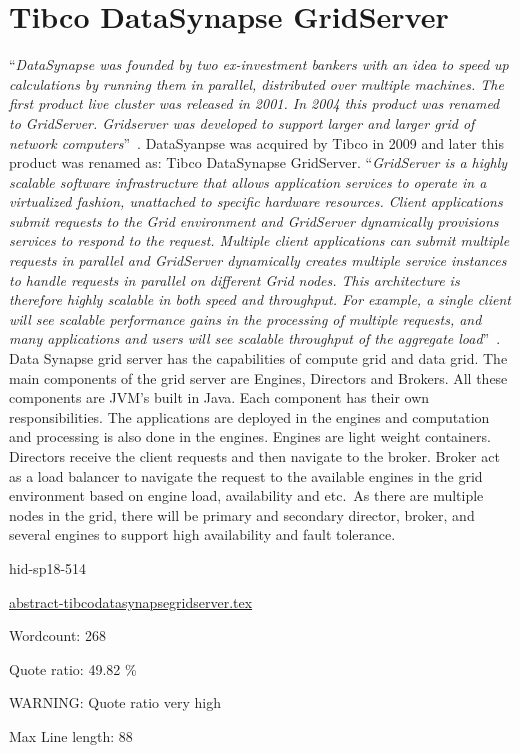 \section{Tibco DataSynapse GridServer}

\color{blue}``\emph{DataSynapse was founded by two ex-investment bankers with an idea to
speed up calculations by running them in parallel, distributed over
multiple machines. The first product live cluster was released in
2001. In 2004 this product was renamed to GridServer. Gridserver was
developed to support larger and larger grid of network
computers}''\color{black}~\cite{hid-sp18-514-datasynapsewiki}. DataSyanpse was
acquired by Tibco in 2009 and later this product was renamed as: Tibco
DataSynapse GridServer\cite{hid-sp18-514-tibcodatasynapsewiki}.
\color{blue}``\emph{GridServer is a highly scalable software infrastructure that allows
application services to operate in a virtualized fashion, unattached
to specific hardware resources. Client applications submit requests to
the Grid environment and GridServer dynamically provisions services to
respond to the request. Multiple client applications can submit
multiple requests in parallel and GridServer dynamically creates
multiple service instances to handle requests in parallel on different
Grid nodes. This architecture is therefore highly scalable in both
speed and throughput. For example, a single client will see scalable
performance gains in the processing of multiple requests, and many
applications and users will see scalable throughput of the aggregate
load}''\color{black}~\cite{hid-sp18-514-tibcods}. Data Synapse grid server has the
capabilities of compute grid and data grid. The main components of the
grid server are Engines, Directors and Brokers. All these components
are JVM's built in Java. Each component has their own
responsibilities. The applications are deployed in the engines and
computation and processing is also done in the engines. Engines are
light weight containers. Directors receive the client requests and
then navigate to the broker. Broker act as a load balancer to navigate
the request to the available engines in the grid environment based on
engine load, availability and etc.\ As there are multiple nodes in the
grid, there will be primary and secondary director, broker, and
several engines to support high availability and fault
tolerance\cite{hid-sp18-514-tibcods}.



\begin{IU}

hid-sp18-514

\href{https://github.com/cloudmesh-community/hid-sp18-514/blob/master//technology/abstract-tibcodatasynapsegridserver.tex}{abstract-tibcodatasynapsegridserver.tex}

 

Wordcount: 268


Quote ratio: 49.82 \%

WARNING: Quote ratio very high
 
Max Line length: 88
\end{IU}

